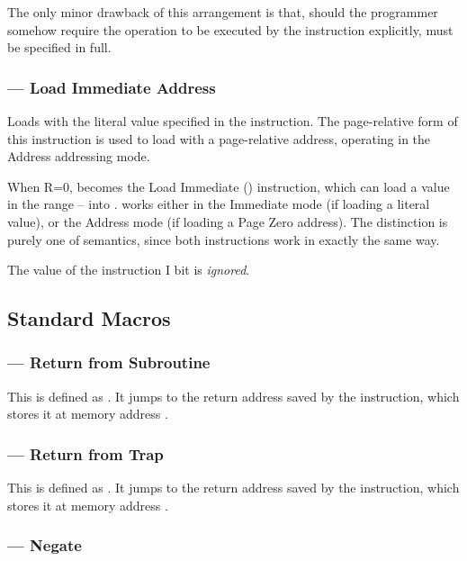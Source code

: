 The only minor drawback of this arrangement is that, should the
programmer somehow require the  operation to be executed by
the  instruction explicitly,  must be specified
in full.

\subsubsection{ — Load Immediate Address}
\label{sec:instruction-LIA}
\label{sec:instruction-LI}

Loads \A{} with the literal value specified in the instruction. The
page-relative form of this instruction is used to load \A{} with a
page-relative address, operating in the Address addressing mode.

When R=0,  becomes the Load Immediate () instruction,
which can load a value in the range – into \A. 
works either in the Immediate mode (if loading a literal value), or the Address
mode (if loading a \gls{Page Zero} address). The distinction is purely one of
semantics, since both instructions work in exactly the same way.

The value of the instruction I bit is {\em ignored}.

\subsection{Standard Macros}
\subsubsection{ — Return from Subroutine}

This is defined as . It jumps to the return address
saved by the  instruction, which stores it at memory address
.

\subsubsection{ — Return from Trap} 

This is defined as . It jumps to the return address
saved by the  instruction, which stores it at memory address
.

\subsubsection{ — Negate \A}


